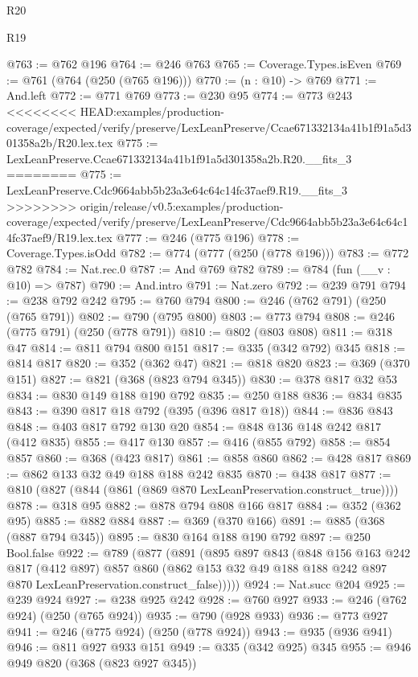 \begin{lexlean}{R20}
\begin{lexlean}{R19}
\begin{coremodule}
{{{{{{{{{{{{{{@763 := @762 @196
@764 := @246 @763
@765 := Coverage.Types.isEven
@769 := @761 (@764 (@250 (@765 @196)))
@770 := (n : @10) -> @769
@771 := And.left
@772 := @771 @769
@773 := @230 @95
@774 := @773 @243
<<<<<<<< HEAD:examples/production-coverage/expected/verify/preserve/LexLeanPreserve/Ccae671332134a41b1f91a5d301358a2b/R20.lex.tex
@775 := LexLeanPreserve.Ccae671332134a41b1f91a5d301358a2b.R20.__fits_3
========
@775 := LexLeanPreserve.Cdc9664abb5b23a3e64c64c14fc37aef9.R19.__fits_3
>>>>>>>> origin/release/v0.5:examples/production-coverage/expected/verify/preserve/LexLeanPreserve/Cdc9664abb5b23a3e64c64c14fc37aef9/R19.lex.tex
@777 := @246 (@775 @196)
@778 := Coverage.Types.isOdd
@782 := @774 (@777 (@250 (@778 @196)))
@783 := @772 @782
@784 := Nat.rec.{0}
@787 := And @769 @782
@789 := @784 (fun (__v : @10) => @787)
@790 := And.intro
@791 := Nat.zero
@792 := @239 @791
@794 := @238 @792 @242
@795 := @760 @794
@800 := @246 (@762 @791) (@250 (@765 @791))
@802 := @790 (@795 @800)
@803 := @773 @794
@808 := @246 (@775 @791) (@250 (@778 @791))
@810 := @802 (@803 @808)
@811 := @318 @47
@814 := @811 @794 @800 @151
@817 := @335 (@342 @792) @345
@818 := @814 @817
@820 := @352 (@362 @47)
@821 := @818 @820
@823 := @369 (@370 @151)
@827 := @821 (@368 (@823 @794 @345))
@830 := @378 @817 @32 @53
@834 := @830 @149 @188 @190 @792
@835 := @250 @188
@836 := @834 @835
@843 := @390 @817 @18 @792 (@395 (@396 @817 @18))
@844 := @836 @843
@848 := @403 @817 @792 @130 @20
@854 := @848 @136 @148 @242 @817 (@412 @835)
@855 := @417 @130
@857 := @416 (@855 @792)
@858 := @854 @857
@860 := @368 (@423 @817)
@861 := @858 @860
@862 := @428 @817
@869 := @862 @133 @32 @49 @188 @188 @242 @835
@870 := @438 @817
@877 := @810 (@827 (@844 (@861 (@869 @870 LexLeanPreservation.construct_true))))
@878 := @318 @95
@882 := @878 @794 @808 @166 @817
@884 := @352 (@362 @95)
@885 := @882 @884
@887 := @369 (@370 @166)
@891 := @885 (@368 (@887 @794 @345))
@895 := @830 @164 @188 @190 @792
@897 := @250 Bool.false
@922 := @789
    (@877
      (@891
        (@895
          @897
          @843
          (@848
            @156
            @163
            @242
            @817
            (@412 @897)
            @857
            @860
            (@862 @153 @32 @49 @188 @188 @242 @897 @870 LexLeanPreservation.construct_false)))))
@924 := Nat.succ @204
@925 := @239 @924
@927 := @238 @925 @242
@928 := @760 @927
@933 := @246 (@762 @924) (@250 (@765 @924))
@935 := @790 (@928 @933)
@936 := @773 @927
@941 := @246 (@775 @924) (@250 (@778 @924))
@943 := @935 (@936 @941)
@946 := @811 @927 @933 @151
@949 := @335 (@342 @925) @345
@955 := @946 @949 @820 (@368 (@823 @927 @345))
}}}}}}}}}}}}}}
\end{coremodule}
\end{lexlean}
\end{lexlean}
